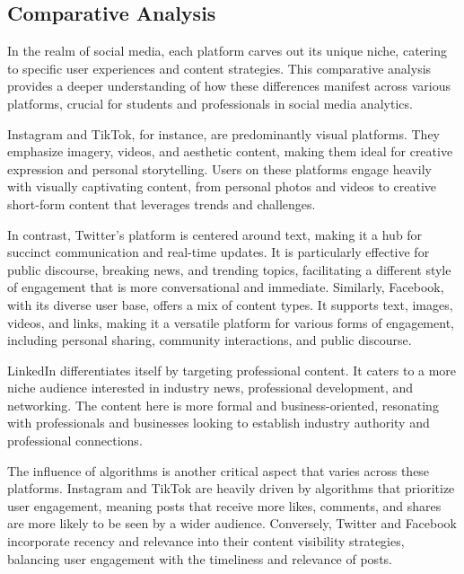 \documentclass[
]{book}
\begin{document}
\hypertarget{comparative-analysis}{%
\subsection*{Comparative Analysis}\label{comparative-analysis}}

In the realm of social media, each platform carves out its unique niche, catering to specific user experiences and content strategies. This comparative analysis provides a deeper understanding of how these differences manifest across various platforms, crucial for students and professionals in social media analytics.

Instagram and TikTok, for instance, are predominantly visual platforms. They emphasize imagery, videos, and aesthetic content, making them ideal for creative expression and personal storytelling. Users on these platforms engage heavily with visually captivating content, from personal photos and videos to creative short-form content that leverages trends and challenges.

In contrast, Twitter's platform is centered around text, making it a hub for succinct communication and real-time updates. It is particularly effective for public discourse, breaking news, and trending topics, facilitating a different style of engagement that is more conversational and immediate. Similarly, Facebook, with its diverse user base, offers a mix of content types. It supports text, images, videos, and links, making it a versatile platform for various forms of engagement, including personal sharing, community interactions, and public discourse.

LinkedIn differentiates itself by targeting professional content. It caters to a more niche audience interested in industry news, professional development, and networking. The content here is more formal and business-oriented, resonating with professionals and businesses looking to establish industry authority and professional connections.

The influence of algorithms is another critical aspect that varies across these platforms. Instagram and TikTok are heavily driven by algorithms that prioritize user engagement, meaning posts that receive more likes, comments, and shares are more likely to be seen by a wider audience. Conversely, Twitter and Facebook incorporate recency and relevance into their content visibility strategies, balancing user engagement with the timeliness and relevance of posts.
\end{document}
